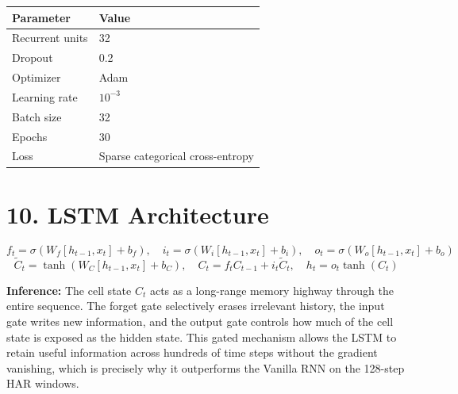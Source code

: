 \documentclass[10pt]{article}
\begin{document}
\begin{center}
\begin{tabular}{|l|l|}
\hline
Parameter & Value\\
\hline
Recurrent units & 32\\
Dropout & 0.2\\
Optimizer & Adam\\
Learning rate & $10^{-3}$\\
Batch size & 32\\
Epochs & 30\\
Loss & Sparse categorical cross-entropy\\
\hline
\end{tabular}
\end{center}

\section*{10. LSTM Architecture}

\[
f_t=\sigma(W_f[h_{t-1},x_t]+b_f),\quad
i_t=\sigma(W_i[h_{t-1},x_t]+b_i),\quad
o_t=\sigma(W_o[h_{t-1},x_t]+b_o)
\]
\[
\tilde{C}_t=\tanh(W_C[h_{t-1},x_t]+b_C),\quad
C_t=f_tC_{t-1}+i_t\tilde{C}_t,\quad
h_t=o_t\tanh(C_t)
\]

\begin{center}
\end{center}

\textbf{Inference:} The cell state $C_t$ acts as a long-range memory highway
through the entire sequence. The forget gate selectively erases irrelevant
history, the input gate writes new information, and the output gate controls
how much of the cell state is exposed as the hidden state. This gated
mechanism allows the LSTM to retain useful information across hundreds of
time steps without the gradient vanishing, which is precisely why it
outperforms the Vanilla RNN on the 128-step HAR windows.

\end{document}
